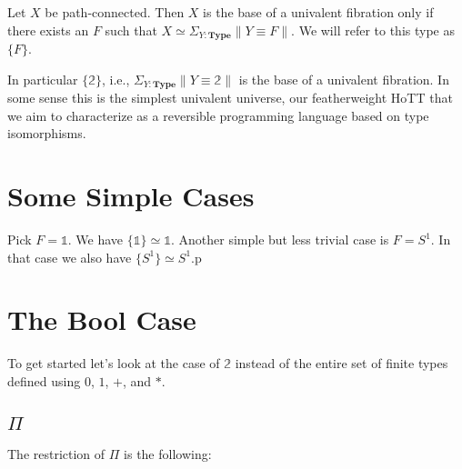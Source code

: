 \documentclass[format=acmlarge,review,natbib]{acmart}
\newcommand{\Typ}{\mathbf{Type}}
\newcommand{\ot}{\mathbb{1}}
\newcommand{\bt}{\mathbb{2}}
\begin{document}
\begin{theorem}
  Let $X$ be path-connected. Then $X$ is the base of a univalent fibration only
  if there exists an $F$ such that $X \simeq \Sigma_{Y : \Typ} \| Y \equiv F
  \|$. We will refer to this type as $\{F\}$.
\end{theorem}

\noindent In particular $\{\bt\}$, i.e.,
$\Sigma_{Y : \Typ} \| Y \equiv \bt \|$ is the base of a univalent
fibration. In some sense this is the simplest univalent universe, our
featherweight HoTT that we aim to characterize as a reversible programming
language based on type isomorphisms.

\section{Some Simple Cases}

Pick $F = \ot$. We have $\{\ot\} \simeq \ot$. Another
simple but less trivial case is $F = S^1$. In that case we also have
$\{S^1\} \simeq S^1$.p

\section{The Bool Case}

To get started let's look at the case of $\bt$ instead of the entire set of finite types defined using $0$, $1$, $+$, and $*$.

\subsection{$\Pi$}

The restriction of $\Pi$ is the following:
\end{document}
